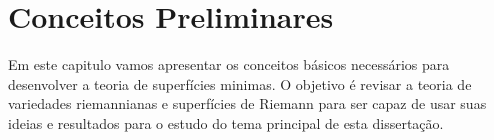 \chapter{Conceitos Preliminares}

Em este capitulo vamos apresentar os conceitos básicos necessários para desenvolver a teoria de superfícies minimas. O objetivo é revisar a teoria de variedades riemannianas e superfícies de Riemann para ser capaz de usar suas ideias e resultados para o estudo do tema principal de esta dissertação.




	
	



